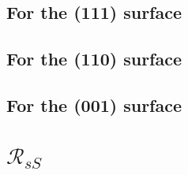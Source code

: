 \subsection{For the (111) surface}


\subsection{For the (110) surface}


\subsection{For the (001) surface}




\section{\texorpdfstring{$\mathcal{R}_{sS}$}{RsS}}

